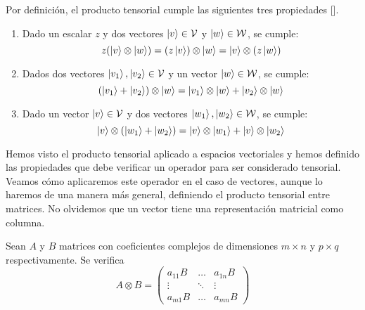 Por definición, el producto tensorial cumple las siguientes tres propiedades [\cite{nielsen2001quantum}].
\begin{enumerate}
\item Dado un escalar $z$ y dos vectores $\left|v\right\rangle\in\mathcal{V}$ y $\left|w\right\rangle\in\mathcal{W}$, se cumple:
$$
z(\left|v\right\rangle\otimes\left|w\right\rangle)= (z\left|v\right\rangle)\otimes\left|w\right\rangle = \left|v\right\rangle\otimes (z\left|w\right\rangle)
$$

\item Dados dos vectores $\left|v_1\right\rangle,\left|v_2\right\rangle\in\mathcal{V}$ y un vector $\left|w\right\rangle\in\mathcal{W}$, se cumple:
$$
(\left|v_1\right\rangle+\left|v_2\right\rangle)\otimes\left|w\right\rangle=\left|v_1\right\rangle\otimes\left|w\right\rangle+\left|v_2\right\rangle\otimes\left|w\right\rangle
$$

\item Dado un vector $\left|v\right\rangle\in\mathcal{V}$ y dos vectores $\left|w_1\right\rangle,\left|w_2\right\rangle\in\mathcal{W}$, se cumple:
$$
\left|v\right\rangle\otimes (\left|w_1\right\rangle+\left|w_2\right\rangle) = \left|v\right\rangle\otimes\left|w_1\right\rangle +\left|v\right\rangle\otimes\left|w_2\right\rangle 
$$
\end{enumerate}

Hemos visto el producto tensorial aplicado a espacios vectoriales y hemos definido las propiedades que debe verificar un operador para ser considerado tensorial. Veamos cómo aplicaremos este operador en el caso de vectores, aunque lo haremos de una manera más general, definiendo el producto tensorial entre matrices. No olvidemos que un vector tiene una representación matricial como columna.

Sean $A$ y $B$ matrices con coeficientes complejos de dimensiones $m\times n$ y $p\times q$ respectivamente. Se verifica
$$
A\otimes B=\left(\begin{matrix}
a_{11}B & \hdots & a_{1n}B \\
\vdots & \ddots & \vdots \\
a_{m1}B & \hdots & a_{mn}B
\end{matrix}\right)
$$

